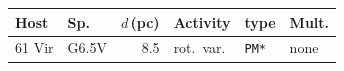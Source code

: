 \begin{tabular}{@{}l@{~}l@{~}r@{~}p{1.25cm}@{~}l@{~}l@{}}
\hline
Host & Sp. & $d$\,(pc) & Activity & type & Mult. \\
\hline
61 Vir & G6.5V & 8.5 & rot.\ var. & \texttt{PM*} & none \\
\hline
\end{tabular}
